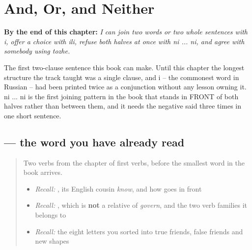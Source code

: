 
\chapter{And, Or, and Neither}
\label{ch:ru-and-or-neither}

\begin{chapteropening}
\textbf{By the end of this chapter:} \emph{I can join two words or two whole sentences with i, offer a choice with ili, refuse both halves at once with ni ... ni, and agree with somebody using tozhe.}

The first two-clause sentence this book can make. Until this chapter the longest structure the track taught was a single clause, and i -- the commonest word in Russian -- had been printed twice as a conjunction without any lesson owning it. ni ... ni is the first joining pattern in the book that stands in FRONT of both halves rather than between them, and it needs the negative said three times in one short sentence.
\end{chapteropening}

\section[\texorpdfstring{\ru{и} (i)}{и (i)}]{ — the word you have already read}

\label{lesson:RU-C16-i}



\begin{quote}
Two verbs from the chapter of first verbs, before the smallest word in the book arrives.

\begin{itemize}
\raggedright
  \item \emph{Recall:} \emph{}, its English cousin \emph{know}, and how \textbf{} goes in front
  \item \emph{Recall:} \emph{}, which is \textbf{not} a relative of \emph{govern}, and the two verb families it belongs to
  \item \emph{Recall:} the eight letters you sorted into true friends, false friends and new shapes
\end{itemize}
\end{quote}

